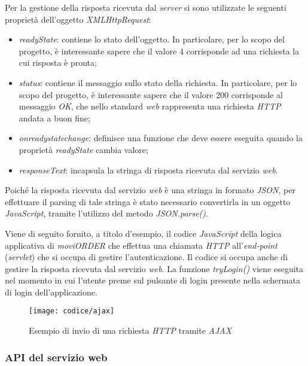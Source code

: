 Per la gestione della risposta ricevuta dal \textit{server} si sono utilizzate le seguenti proprietà dell'oggetto \textit{XMLHttpRequest}:
\begin{itemize}
	\item \textit{readyState}: contiene lo stato dell'oggetto. In particolare, per lo scopo del progetto, è interessante sapere che il valore 4 corrisponde ad una richiesta la cui risposta è pronta;
	\item  \textit{status}: contiene il messaggio sullo stato della richiesta. In particolare, per lo scopo del progetto, è interessante sapere che il valore 200 corrisponde al messaggio \textit{OK}, che nello standard \textit{web} rappresenta una richiesta \textit{HTTP} andata a buon fine;
	\item \textit{onreadystatechange}: definisce una funzione che deve essere eseguita quando la proprietà \textit{readyState} cambia valore;
	\item \textit{responseText}: incapsula la stringa di risposta ricevuta dal servizio \textit{web}. 
\end{itemize} 
Poiché la risposta ricevuta dal servizio \textit{web} è una stringa in formato \textit{JSON}, per effettuare il parsing di tale stringa è stato necessario convertirla in un oggetto \textit{JavaScript}, tramite l'utilizzo del metodo \textit{JSON.parse()}.

Viene di seguito fornito, a titolo d'esempio, il codice \textit{JavaScript} della logica applicativa di \textit{moviORDER} che effettua una chiamata \textit{HTTP} all'\textit{end-point} (\textit{servlet}) che si occupa di gestire l'autenticazione. Il codice si occupa anche di gestire la risposta ricevuta dal servizio \textit{web}. La funzione \textit{tryLogin()} viene eseguita nel momento in cui l'utente preme sul pulsante di login presente nella schermata di login dell'applicazione.

\newpage

\begin{figure}[!h] 
    \centering 
    \texttt{[image: codice/ajax]} 
    \caption{Esempio di invio di una richiesta \textit{HTTP} tramite \textit{AJAX}}
\end{figure}

\subsubsection{API del servizio web} \label{api}

